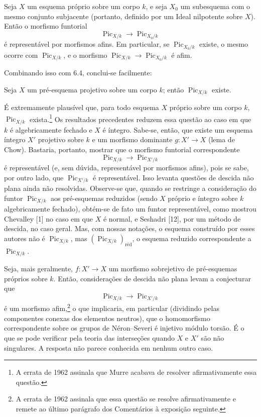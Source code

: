  Seja $X$ um esquema próprio sobre um corpo $k$, e seja
$X_0$ um subesquema com o mesmo conjunto subjacente (portanto, definido por um
Ideal nilpotente sobre $X$). Então o morfismo funtorial
\[
\operatorname{Pic}_{X/k}\longrightarrow\operatorname{Pic}_{X_0/k}
\]
é representável por morfismos afins. Em particular, se
$\operatorname{Pic}_{X_0/k}$ existe, o mesmo ocorre com
$\operatorname{Pic}_{X/k}$, e o morfismo
$\operatorname{Pic}_{X/k}\longrightarrow\operatorname{Pic}_{X_0/k}$ é afim.

Combinando isso com 6.4, conclui-se facilmente:

 Seja $X$ um pré-esquema projetivo sobre um corpo $k$;
então $\operatorname{Pic}_{X/k}$ existe.

 É extremamente plausível que, para todo esquema $X$
próprio sobre um corpo $k$, $\operatorname{Pic}_{X/k}$ exista.\footnote{A
errata de 1962 assinala que Murre acabava de resolver afirmativamente essa
questão.} Os resultados precedentes reduzem essa questão ao caso em que $k$ é
algebricamente fechado e $X$ é íntegro. Sabe-se, então, que existe um esquema
íntegro $X'$ projetivo sobre $k$ e um morfismo dominante
$g:X'\longrightarrow X$ (lema de Chow). Bastaria, portanto, mostrar que o
morfismo funtorial correspondente
\[
\operatorname{Pic}_{X/k}\longrightarrow\operatorname{Pic}_{X'/k}
\]
é representável (e, sem dúvida, representável por morfismos afins), pois se
sabe, por outro lado, que $\operatorname{Pic}_{X'/k}$ é representável. Isso
levanta questões de descida não plana ainda não resolvidas. Observe-se que,
quando se restringe a consideração do funtor $\operatorname{Pic}_{X/k}$ aos
pré-esquemas reduzidos (sendo $X$ próprio e íntegro sobre $k$ algebricamente
fechado), obtém-se de fato um funtor representável, como mostrou Chevalley [1]
no caso em que $X$ é normal, e Seshadri [12], por um método de descida, no caso
geral. Mas, com nossas notações, o esquema construído por esses autores não é
$\operatorname{Pic}_{X/k}$, mas
$(\operatorname{Pic}_{X/k})_{\mathrm{réd}}$, o esquema reduzido correspondente
a $\operatorname{Pic}_{X/k}$.

 Seja, mais geralmente, $f:X'\longrightarrow X$ um
morfismo sobrejetivo de pré-esquemas próprios sobre $k$. Então, considerações de
descida não plana levam a conjecturar que
\[
\operatorname{Pic}_{X/k}\longrightarrow\operatorname{Pic}_{X'/k}
\]
é um morfismo afim,\footnote{A errata de 1962 assinala que essa questão se
resolve afirmativamente e remete ao último parágrafo dos Comentários à
exposição seguinte.} o que implicaria, em particular (dividindo pelas
componentes conexas dos elementos neutros), que o homomorfismo correspondente
sobre os grupos de Néron--Severi é injetivo módulo torsão. É o que se pode
verificar pela teoria das interseções quando $X$ e $X'$ são não singulares. A
resposta não parece conhecida em nenhum outro caso.

